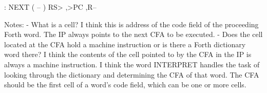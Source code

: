 \documentclass[
    letterpaper, %
	fontsize=10pt, %
	twoside=true, %
	numbers=noenddot, %
]{kaobook}
\begin{document}
    : NEXT ( -- )
        RS> ,>PC ,R--


Notes:
   - What is a cell? I think this is address of the code field of the
   proceeding Forth word. The IP always points to the next CFA to be
   executed.
   - Does the cell located at the CFA hold a machine instruction or
   is there a Forth dictionary word there? I think the contents of the
   cell pointed to by the CFA in the IP is always a machine instruction.
   I think the word INTERPRET handles the task of looking through the
   dictionary and determining the CFA of that word. The CFA should be
   the first cell of a word's code field, which can be one or more cells.



















\printindex %





%

\end{document}
